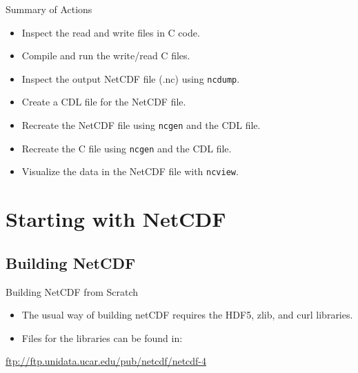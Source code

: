 \documentclass[compress,11pt,xcolor=svgnames,aspectratio=169]{beamer}
\begin{document}
\begin{frame}[fragile]{Summary of Actions}

\begin{itemize}
\setlength\itemsep{0.3cm}

  \item Inspect the read and write files in C code.
  \item Compile and run the write/read C files.
  \item Inspect the output NetCDF file (.nc) using \texttt{ncdump}.
  \item Create a CDL file for the NetCDF file.
  \item Recreate the NetCDF file using \texttt{ncgen} and the CDL file.
  \item Recreate the C file using \texttt{ncgen} and the CDL file.
  \item Visualize the data in the NetCDF file with \texttt{ncview}.

\end{itemize}

\end{frame}

\appendix

\section{Starting with NetCDF}
\label{netcdf}

\subsection{Building NetCDF}

\begin{frame}[fragile]{Building NetCDF from Scratch}

\begin{itemize}
\setlength\itemsep{0.8cm}

  \item The usual way of building netCDF requires the HDF5, zlib, and curl libraries.

  \item Files for the libraries can be found in:

\end{itemize}

\begin{center}
\url{ftp://ftp.unidata.ucar.edu/pub/netcdf/netcdf-4}
\end{center}

\end{frame}
\end{document}
